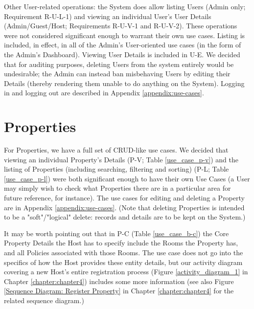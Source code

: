   \vspace{-1cm}
  Other User-related operations: the System does allow listing Users (Admin only; Requirement R-U-L-1) and viewing an individual User's User Details (Admin/Guest/Host; Requirements R-U-V-1 and R-U-V-2). These operations were not considered significant enough to warrant their own use cases. Listing is included, in effect, in all of the Admin's User-oriented use cases (in the form of the Admin's Dashboard). Viewing User Details is included in U-E. We decided that for auditing purposes, deleting Users from the system entirely would be undesirable; the Admin can instead ban misbehaving Users by editing their Details (thereby rendering them unable to do anything on the System). Logging in and logging out are described in Appendix \ref{appendix:use-cases}.

  \vspace{-0.6cm}
\section{Properties}

For Properties, we have a full set of CRUD-like use cases. We decided that viewing an individual Property's Details (P-V; Table \ref{use_case_p-v}) and the listing of Properties (including searching, filtering and sorting) (P-L; Table \ref{use_case_p-l}) were both significant enough to have their own Use Cases (a User may simply wish to check what Properties there are in a particular area for future reference, for instance). The use cases for editing and deleting a Property are in Appendix \ref{appendix:use-cases}. (Note that deleting Properties is intended to be a "soft"/"logical" delete: records and details are to be kept on the System.)

It may be worth pointing out that in P-C (Table \ref{use_case_b-c}) the Core Property Details the Host has to specify include the Rooms the Property has, and all Policies associated with those Rooms. The use case does not go into the specifics of how the Host provides these entity details, but our activity diagram covering a new Host's entire registration process (Figure \ref{activity_diagram_1} in Chapter \ref{chapter:chapter4}) includes some more information (see also Figure \ref{Sequence Diagram: Register Property} in Chapter \ref{chapter:chapter4} for the related sequence diagram.) 

